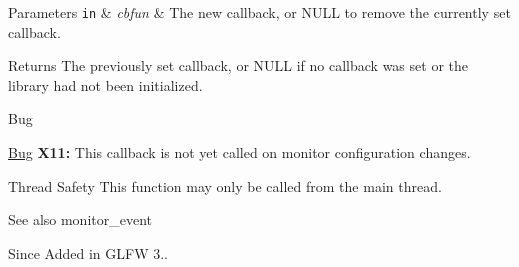 \begin{DoxyParams}[1]{Parameters}
\mbox{\tt in}  & {\em cbfun} & The new callback, or {\ttfamily N\+U\+L\+L} to remove the currently set callback. \\
\hline
\end{DoxyParams}
\begin{DoxyReturn}{Returns}
The previously set callback, or {\ttfamily N\+U\+L\+L} if no callback was set or the library had not been initialized.
\end{DoxyReturn}
\begin{DoxyRefDesc}{Bug}
\item[\hyperlink{bug__bug000001}{Bug}]{\bfseries X11\+:} This callback is not yet called on monitor configuration changes.\end{DoxyRefDesc}


\begin{DoxyParagraph}{Thread Safety}
This function may only be called from the main thread.
\end{DoxyParagraph}
\begin{DoxySeeAlso}{See also}
monitor\+\_\+event
\end{DoxySeeAlso}
\begin{DoxySince}{Since}
Added in G\+L\+F\+W 3.. 
\end{DoxySince}
